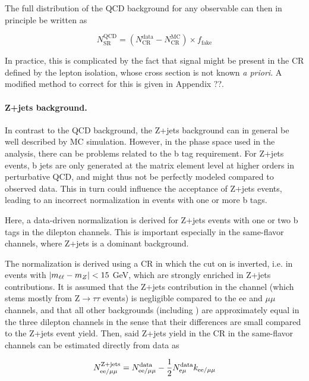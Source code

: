 The full distribution of the QCD background for any observable can then in principle be written as

\begin{equation}
    N_{\text{SR}}^{\text{QCD}} = ( N_{\text{CR}}^{\text{data}} - N_{\text{CR}}^{\text{MC}} ) \times f_{\mathrm{fake}}
\end{equation}

In practice, this is complicated by the fact that \ttbar signal might be present in the CR defined by the lepton isolation, whose cross section is not known \textit{a priori}. A modified method to correct for this is given in Appendix ??.

\paragraph{Z+jets background.}

In contrast to the QCD background, the Z+jets background can in general be well described by MC simulation. However, in the phase space used in the analysis, there can be problems related to the b tag requirement. For Z+jets events, b jets are only generated at the matrix element level at higher orders in perturbative QCD, and might thus not be perfectly modeled compared to observed data. This in turn could influence the acceptance of Z+jets events, leading to an incorrect normalization in events with one or more b tags.

Here, a data-driven normalization is derived for Z+jets events with one or two b tags in the dilepton channels. This is important especially in the same-flavor channels, where Z+jets is a dominant background.

The normalization is derived using a CR in which the cut on \mll is inverted, i.e. in events with $| m_{\ell\ell} - m_Z | < 15$ GeV, which are strongly enriched in Z+jets contributions. It is assumed that the Z+jets contribution in the \emu channel (which stems mostly from $\mathrm{Z} \rightarrow \tau \tau$ events) is negligible compared to the ee and $\mu \mu$ channels, and that all other backgrounds (including \ttbar) are approximately equal in the three dilepton channels in the sense that their differences are small compared to the Z+jets event yield. Then, said Z+jets yield in the CR in the same-flavor channels can be estimated directly from data as

\begin{equation}
\label{eq:ttxs:zjets_yield}
    N_{\mathrm{ee / \mu\mu}}^{\mathrm{Z+jets}} = N_{\mathrm{ee / \mu\mu}}^{\mathrm{data}} - \frac{1}{2} N_{\mathrm{\mathrm{e\mu}}}^{\mathrm{data}} k_{\mathrm{ee / \mu\mu}}
\end{equation}

